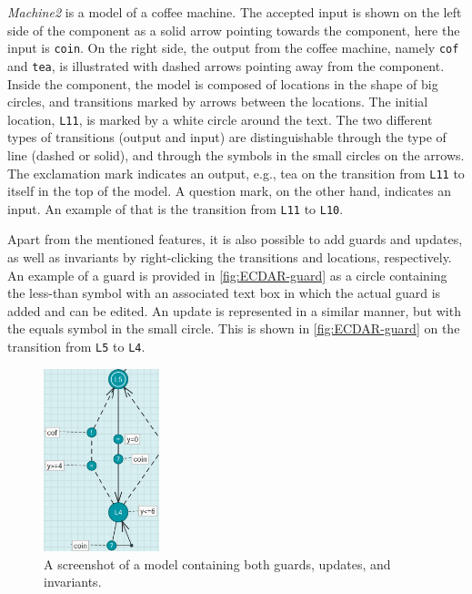 \textit{Machine2} is a model of a coffee machine. The accepted input is shown on the left side of the component as a solid arrow pointing towards the component, here the input is \texttt{coin}. On the right side, the output from the coffee machine, namely \texttt{cof} and \texttt{tea}, is illustrated with dashed arrows pointing away from the component. 
Inside the component, the model is composed of locations in the shape of big circles, and transitions marked by arrows between the locations. The initial location, \texttt{L11}, is marked by a white circle around the text.
The two different types of transitions (output and input) are distinguishable through the type of line (dashed or solid), and through the symbols in the small circles on the arrows. The exclamation mark indicates an output, e.g., tea on the transition from \texttt{L11} to itself in the top of the model. A question mark, on the other hand, indicates an input. An example of that is the transition from \texttt{L11} to \texttt{L10}.

Apart from the mentioned features, it is also possible to add guards and updates, as well as invariants by right-clicking the transitions and locations, respectively. An example of a guard is provided in \autoref{fig:ECDAR-guard} as a circle containing the less-than symbol with an associated text box in which the actual guard is added and can be edited. 
An update is represented in a similar manner, but with the equals symbol in the small circle. This is shown in \autoref{fig:ECDAR-guard} on the transition from \texttt{L5} to \texttt{L4}.

\begin{figure}[H]
    \centering
    \includegraphics[width=0.3\textwidth]{common/figures/ecdar-guards.jpg}
    \caption{A screenshot of a model containing both guards, updates, and invariants.}
    \label{fig:ECDAR-guard}
\end{figure}

